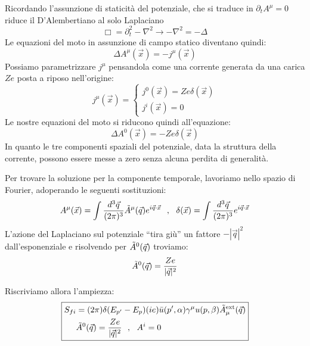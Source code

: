 \documentclass[../main.tex]{subfiles}
\begin{document}
\begin{enumerate}
    Ricordando l'assunzione di staticità del potenziale, che si traduce in \(\partial_t A^\mu = 0\) riduce il D'Alembertiano al solo Laplaciano \[\Box = \partial_t^2 - \nabla^2 \rightarrow -\nabla^2 = -\Delta\]
    Le equazioni del moto in assunzione di campo statico diventano quindi:
    \begin{equation}
        \Delta A^\mu(\Vec x) = -j^\mu(\Vec x)
        \label{eq:static_maxwell_eq_source}
    \end{equation}
    Possiamo parametrizzare $j^\mu$ pensandola come una corrente generata da una carica $Ze$ posta a riposo nell'origine: 
    \[
    j^\mu(\Vec x) = 
    \begin{cases} 
        j^0(\Vec{x}) = Ze\delta(\Vec x)\\
        j^i(\Vec{x}) = 0
    \end{cases}
    \]
    Le nostre equazioni del moto si riducono quindi all'equazione:
    \[
    \Delta A^0(\Vec x) = -Ze\delta(\Vec{x})
    \]
    In quanto le tre componenti spaziali del potenziale, data la struttura della corrente, possono essere messe a zero senza alcuna perdita di generalità.

    Per trovare la soluzione per la componente temporale, lavoriamo nello spazio di Fourier, adoperando le seguenti sostituzioni:
    \[
    A^\mu(\Vec x) = \int\frac{d^3\Vec q}{(2\pi)^3}\Tilde{A}^\mu(\Vec{q})e^{i\Vec{q}\cdot\Vec{x}} ~~,~~ \delta(\Vec{x}) = \int\frac{d^3\Vec q}{(2\pi)^3}e^{i\Vec{q}\cdot\Vec{x}} 
    \]
    L'azione del Laplaciano sul potenziale “tira giù” un fattore $-|\Vec{q}|^2$ dall'esponenziale e risolvendo per $\Tilde A^0(\Vec q)$ troviamo: 
    \[ \Tilde A^0(\Vec q) = \frac{Ze}{|\Vec{q}|^2}\]

    Riscriviamo allora l'ampiezza:
    \begin{equation}
    \boxed{
        \begin{aligned}
        S_{fi}&=(2\pi) \delta(E_{p'}-E_p) (ie)\bar u(p',\alpha) \gamma^\mu u( p,\beta)\Tilde{A}_\mu^\text{ext}(\Vec{q})\\
        & \Tilde A^0(\Vec q) = \frac{Ze}{|\Vec{q}|^2} ~~,~~ A^i=0 
        \end{aligned}
        }
        \label{eq:coulomb_scattering_amplitude_QED_with_potential}
    \end{equation}


\end{enumerate}
\end{document}
